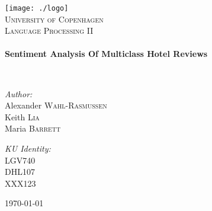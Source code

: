 \begin{titlepage}
\begin{center}

\texttt{[image: ./logo]}~\\[1cm]

\textsc{\LARGE University of Copenhagen}\\[1.5cm]

\textsc{\Large Language Processing II}\\[0.5cm]

\HRule \\[0.4cm]
{ \huge \bfseries Sentiment Analysis Of Multiclass Hotel Reviews \\[0.4cm] }

\HRule \\[1.5cm]

\begin{minipage}{0.45\textwidth}
\begin{flushleft} \large
\emph{Author:}\\
Alexander \textsc{Wahl-Rasmussen} \\
Keith \textsc{Lia} \\
Maria \textsc{Barrett}
\end{flushleft}
\end{minipage}
\begin{minipage}{0.45\textwidth}
\begin{flushright} \large
\emph{KU Identity:} \\
\textsc{LGV740} \\
\textsc{DHL107} \\
\textsc{XXX123}
\end{flushright}
\end{minipage}

\vfill

{\large \today}

\end{center}
\end{titlepage}
